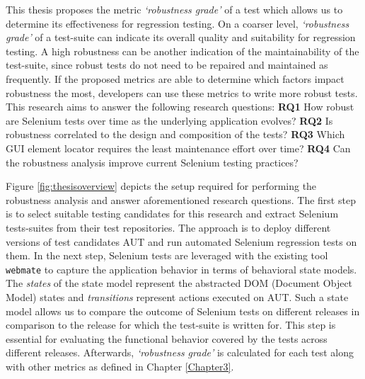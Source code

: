 This thesis proposes the metric \textit{`robustness grade'} of a test which allows us to determine its effectiveness for regression testing. On a coarser level, \textit{`robustness grade'} of a test-suite can indicate its overall quality and suitability for regression testing. A high robustness can be another indication of the maintainability of the test-suite, since robust tests do not need to be repaired and maintained as frequently. If the proposed metrics are able to determine which factors impact robustness the most, developers can use these metrics to write more robust tests. This research aims to answer the following research questions:
\newline
{\bfseries RQ1} How robust are Selenium tests over time as the underlying application evolves?  \newline
{\bfseries RQ2} Is robustness correlated to the design and composition of the tests?\newline
{\bfseries RQ3} Which GUI element locator requires the least maintenance effort over time?\newline
{\bfseries RQ4} Can the robustness analysis improve current Selenium testing practices?\newline


Figure \ref{fig:thesisoverview} depicts the setup required for performing the robustness analysis and answer aforementioned research questions. 
The first step is to select suitable testing candidates for this research and extract Selenium tests-suites from their test repositories. The approach is to deploy different versions of test candidates AUT and run automated Selenium regression tests on them. In the next step, Selenium tests are leveraged with the existing tool \texttt{webmate} \cite{webmate} to capture the application behavior in terms of behavioral state models. The \textit{states} of the state model represent the abstracted DOM (Document Object Model) states and \textit{transitions} represent actions executed on AUT. Such a state model allows us to compare the outcome of Selenium tests on different releases in comparison to the release for which the test-suite is written for. This step is essential for evaluating the functional behavior covered by the tests across different releases. Afterwards, \textit{`robustness grade'} is calculated for each test along with other metrics as defined in Chapter \ref{Chapter3}.\newline

